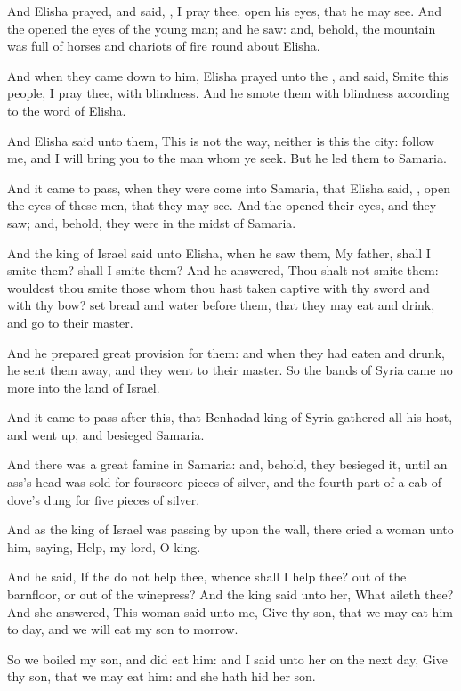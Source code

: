\Verse And Elisha prayed, and said, \LORD, I pray thee, open his eyes, that he may see. And the \LORD opened the eyes of the young man; and he saw: and, behold, the mountain was full of horses and chariots of fire round about Elisha.

\Verse And when they came down to him, Elisha prayed unto the \LORD, and said, Smite this people, I pray thee, with blindness. And he smote them with blindness according to the word of Elisha.

\Verse And Elisha said unto them, This is not the way, neither is this the city: follow me, and I will bring you to the man whom ye seek. But he led them to Samaria.

\Verse And it came to pass, when they were come into Samaria, that Elisha said, \LORD, open the eyes of these men, that they may see. And the \LORD opened their eyes, and they saw; and, behold, they were in the midst of Samaria.

\Verse And the king of Israel said unto Elisha, when he saw them, My father, shall I smite them? shall I smite them?  \Verse And he answered, Thou shalt not smite them: wouldest thou smite those whom thou hast taken captive with thy sword and with thy bow? set bread and water before them, that they may eat and drink, and go to their master.

\Verse And he prepared great provision for them: and when they had eaten and drunk, he sent them away, and they went to their master. So the bands of Syria came no more into the land of Israel.

\Verse And it came to pass after this, that Benhadad king of Syria gathered all his host, and went up, and besieged Samaria.

\Verse And there was a great famine in Samaria: and, behold, they besieged it, until an ass's head was sold for fourscore pieces of silver, and the fourth part of a cab of dove's dung for five pieces of silver.

\Verse And as the king of Israel was passing by upon the wall, there cried a woman unto him, saying, Help, my lord, O king.

\Verse And he said, If the \LORD do not help thee, whence shall I help thee?  out of the barnfloor, or out of the winepress?  \Verse And the king said unto her, What aileth thee? And she answered, This woman said unto me, Give thy son, that we may eat him to day, and we will eat my son to morrow.

\Verse So we boiled my son, and did eat him: and I said unto her on the next day, Give thy son, that we may eat him: and she hath hid her son.

